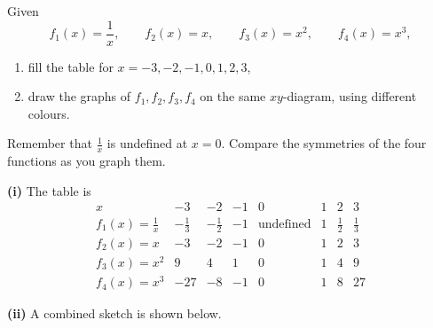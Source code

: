 \begin{problem}
Given
\[
f_1(x)=\frac1x,\qquad f_2(x)=x,\qquad f_3(x)=x^2,\qquad f_4(x)=x^3,
\]
\begin{enumerate}[label=(\roman*)]
\item fill the table for $x=-3,-2,-1,0,1,2,3$,
\item draw the graphs of $f_1,f_2,f_3,f_4$ on the same $xy$-diagram, using different colours.
\end{enumerate}
\end{problem}

\begin{hint}
Remember that $\frac{1}{x}$ is undefined at $x=0$. Compare the symmetries of the four functions as you graph them.
\end{hint}

\begin{solution}
\textbf{(i)} The table is
\[
\begin{array}{c|ccccccc}
x & -3 & -2 & -1 & 0 & 1 & 2 & 3\\ \hline
f_1(x)=\frac1x & -\frac13 & -\frac12 & -1 & \text{undefined} & 1 & \frac12 & \frac13\\
f_2(x)=x & -3 & -2 & -1 & 0 & 1 & 2 & 3\\
f_3(x)=x^2 & 9 & 4 & 1 & 0 & 1 & 4 & 9\\
f_4(x)=x^3 & -27 & -8 & -1 & 0 & 1 & 8 & 27
\end{array}
\]

\textbf{(ii)} A combined sketch is shown below.

\begin{center}
\end{center}
\end{solution}

